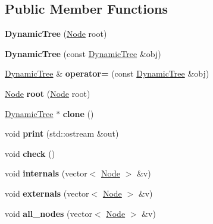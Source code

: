 \subsection*{Public Member Functions}
\begin{DoxyCompactItemize}
\item 
\mbox{\label{classez_1_1trees_1_1DynamicTree_a9b5a79a5db2c79cb753dcd73fad38fea}} 
{\bfseries Dynamic\+Tree} (\hyperlink{classez_1_1trees_1_1DynamicNode}{Node} root)
\item 
\mbox{\label{classez_1_1trees_1_1DynamicTree_a7c554953cab2445da03e5c768dbee461}} 
{\bfseries Dynamic\+Tree} (const \hyperlink{classez_1_1trees_1_1DynamicTree}{Dynamic\+Tree} \&obj)
\item 
\mbox{\label{classez_1_1trees_1_1DynamicTree_a092f66c0070c7ec99088664ac2320b3b}} 
\hyperlink{classez_1_1trees_1_1DynamicTree}{Dynamic\+Tree} \& {\bfseries operator=} (const \hyperlink{classez_1_1trees_1_1DynamicTree}{Dynamic\+Tree} \&obj)
\item 
\mbox{\label{classez_1_1trees_1_1DynamicTree_a2884268cbef7f33c3083074c94960c58}} 
\hyperlink{classez_1_1trees_1_1DynamicNode}{Node} {\bfseries root} (\hyperlink{classez_1_1trees_1_1DynamicNode}{Node} root)
\item 
\mbox{\label{classez_1_1trees_1_1DynamicTree_a581921c9e8e066f3a369e3cc938688b4}} 
\hyperlink{classez_1_1trees_1_1DynamicTree}{Dynamic\+Tree} $\ast$ {\bfseries clone} ()
\item 
\mbox{\label{classez_1_1trees_1_1DynamicTree_a000f6b52c2570e0823df719d60077b65}} 
void {\bfseries print} (std\+::ostream \&out)
\item 
\mbox{\label{classez_1_1trees_1_1DynamicTree_a48602b01c5d440c0d935a7f691a02321}} 
void {\bfseries check} ()
\item 
\mbox{\label{classez_1_1trees_1_1DynamicTree_ad1346106fdd05be7ffd407b5e573057e}} 
void {\bfseries internals} (vector$<$ \hyperlink{classez_1_1trees_1_1DynamicNode}{Node} $>$ \&v)
\item 
\mbox{\label{classez_1_1trees_1_1DynamicTree_afbdf8368cf4b8ba2665cfd1c6477addf}} 
void {\bfseries externals} (vector$<$ \hyperlink{classez_1_1trees_1_1DynamicNode}{Node} $>$ \&v)
\item 
\mbox{\label{classez_1_1trees_1_1DynamicTree_aadeda48b1ef2a83c9dee13961ea28ec2}} 
void {\bfseries all\+\_\+nodes} (vector$<$ \hyperlink{classez_1_1trees_1_1DynamicNode}{Node} $>$ \&v)
\end{DoxyCompactItemize}

